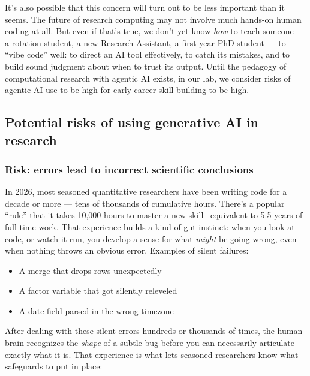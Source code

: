 \documentclass[
]{book}
\providecommand{\tightlist}{%
  \setlength{\itemsep}{0pt}\setlength{\parskip}{0pt}}
\begin{document}
It's also possible that this concern will turn out to be less important
than it seems. The future of research computing may not involve much
hands-on human coding at all. But even if that's true, we don't yet know
\emph{how} to teach someone --- a rotation student, a new Research Assistant, a
first-year PhD student --- to ``vibe code'' well: to direct an AI tool
effectively, to catch its mistakes, and to build sound judgment about
when to trust its output. Until the pedagogy of computational research
with agentic AI exists, in our lab, we consider risks of agentic AI use
to be high for early-career skill-building to be high.

\subsection{Potential risks of using generative AI in research}\label{potential-risks-of-using-generative-ai-in-research}

\subsubsection{Risk: errors lead to incorrect scientific conclusions}\label{risk-errors-lead-to-incorrect-scientific-conclusions}

In 2026, most seasoned quantitative researchers have been writing code
for a decade or more --- tens of thousands of cumulative hours. There's a
popular ``rule'' that \href{https://en.wikipedia.org/wiki/Outliers_(book)}{it takes 10,000
hours} to master a new
skill-- equivalent to 5.5 years of full time work. That experience
builds a kind of gut instinct: when you look at code, or watch it run,
you develop a sense for what \emph{might} be going wrong, even when nothing
throws an obvious error. Examples of silent failures:

\begin{itemize}
\tightlist
\item
  A merge that drops rows unexpectedly
\item
  A factor variable that got silently releveled
\item
  A date field parsed in the wrong timezone
\end{itemize}

After dealing with these silent errors hundreds or thousands of times,
the human brain recognizes the \emph{shape} of a subtle bug before you can
necessarily articulate exactly what it is. That experience is what lets
seasoned researchers know what safeguards to put in place:
\end{document}
